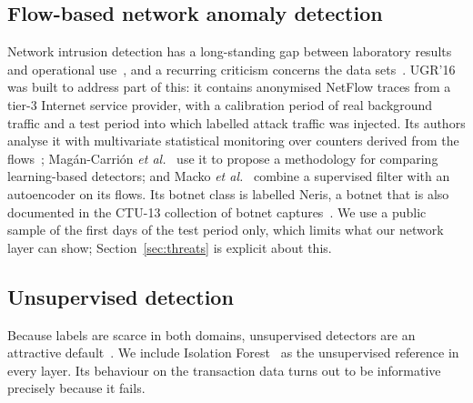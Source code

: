 \subsection{Flow-based network anomaly detection}
Network intrusion detection has a long-standing gap between laboratory results and operational use~\cite{sommer2010,apruzzese2023}, and a recurring criticism concerns the data sets~\cite{ring2019}. UGR'16~\cite{macia2018} was built to address part of this: it contains anonymised NetFlow traces from a tier-3 Internet service provider, with a calibration period of real background traffic and a test period into which labelled attack traffic was injected. Its authors analyse it with multivariate statistical monitoring over counters derived from the flows~\cite{camacho2019}; Mag\'an-Carri\'on \emph{et al.}~\cite{magan2020} use it to propose a methodology for comparing learning-based detectors; and Macko \emph{et al.}~\cite{macko2023} combine a supervised filter with an autoencoder on its flows. Its botnet class is labelled Neris, a botnet that is also documented in the CTU-13 collection of botnet captures~\cite{garcia2014}. We use a public sample of the first days of the test period only, which limits what our network layer can show; Section~\ref{sec:threats} is explicit about this.

\subsection{Unsupervised detection}
Because labels are scarce in both domains, unsupervised detectors are an attractive default~\cite{chandola2009,akoglu2015}. We include Isolation Forest~\cite{liu2008} as the unsupervised reference in every layer. Its behaviour on the transaction data turns out to be informative precisely because it fails.
